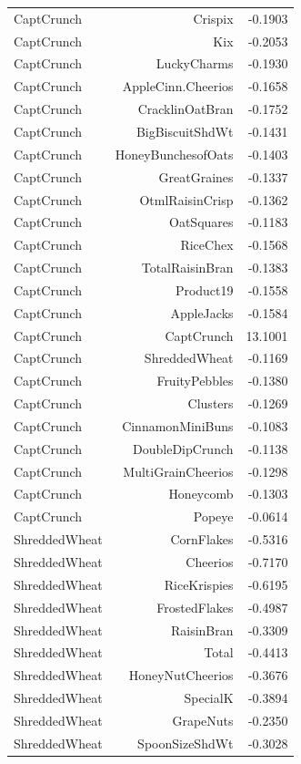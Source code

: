 \begin{longtable}{@{}lrr@{}}
CaptCrunch & Crispix & -0.1903 \\
CaptCrunch & Kix & -0.2053 \\
CaptCrunch & LuckyCharms & -0.1930 \\
CaptCrunch & AppleCinn.Cheerios & -0.1658 \\
CaptCrunch & CracklinOatBran & -0.1752 \\
CaptCrunch & BigBiscuitShdWt & -0.1431 \\
CaptCrunch & HoneyBunchesofOats & -0.1403 \\
CaptCrunch & GreatGraines & -0.1337 \\
CaptCrunch & OtmlRaisinCrisp & -0.1362 \\
CaptCrunch & OatSquares & -0.1183 \\
CaptCrunch & RiceChex & -0.1568 \\
CaptCrunch & TotalRaisinBran & -0.1383 \\
CaptCrunch & Product19 & -0.1558 \\
CaptCrunch & AppleJacks & -0.1584 \\
CaptCrunch & CaptCrunch & 13.1001 \\
CaptCrunch & ShreddedWheat & -0.1169 \\
CaptCrunch & FruityPebbles & -0.1380 \\
CaptCrunch & Clusters & -0.1269 \\
CaptCrunch & CinnamonMiniBuns & -0.1083 \\
CaptCrunch & DoubleDipCrunch & -0.1138 \\
CaptCrunch & MultiGrainCheerios & -0.1298 \\
CaptCrunch & Honeycomb & -0.1303 \\
CaptCrunch & Popeye & -0.0614 \\
ShreddedWheat & CornFlakes & -0.5316 \\
ShreddedWheat & Cheerios & -0.7170 \\
ShreddedWheat & RiceKrispies & -0.6195 \\
ShreddedWheat & FrostedFlakes & -0.4987 \\
ShreddedWheat & RaisinBran & -0.3309 \\
ShreddedWheat & Total & -0.4413 \\
ShreddedWheat & HoneyNutCheerios & -0.3676 \\
ShreddedWheat & SpecialK & -0.3894 \\
ShreddedWheat & GrapeNuts & -0.2350 \\
ShreddedWheat & SpoonSizeShdWt & -0.3028 \\

\end{longtable}
